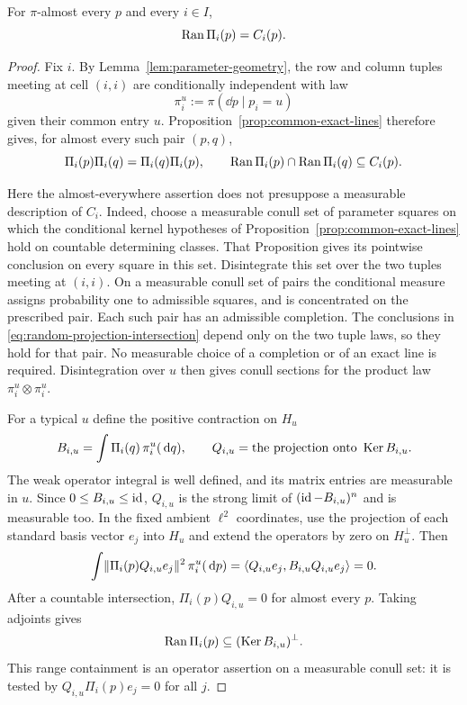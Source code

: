 \begin{lemma}\label{lem:active-exact}
For $\pi$-almost every $p$ and every $i\in I$,
\begin{equation}\label{eq:active-exact}
 \operatorname{Ran}\Pi_i(p)=C_i(p).
\end{equation}
\end{lemma}

\begin{proof}
Fix $i$. By Lemma~\ref{lem:parameter-geometry}, the row and column
tuples meeting at cell $(i,i)$ are conditionally independent with law
\[
 \pi_i^u:=\pi(\dd p\mid p_i=u)
\]
given their common entry $u$. Proposition~\ref{prop:common-exact-lines}
therefore gives, for almost every such pair $(p,q)$,
\begin{equation}\label{eq:random-projection-intersection}
 \Pi_i(p)\Pi_i(q)=\Pi_i(q)\Pi_i(p),\qquad
 \operatorname{Ran}\Pi_i(p)\cap\operatorname{Ran}\Pi_i(q)\subseteq C_i(p).
\end{equation}

Here the almost-everywhere assertion does not presuppose a measurable
description of $C_i$. Indeed, choose a measurable conull set of
parameter squares on which the conditional kernel hypotheses of
Proposition~\ref{prop:common-exact-lines} hold on countable determining
classes. That Proposition gives its pointwise conclusion on every
square in this set. Disintegrate this set over the two tuples meeting
at $(i,i)$. On a measurable conull set of pairs the conditional measure
assigns probability one to admissible squares, and is concentrated on
the prescribed pair. Each such pair has an admissible completion.
The conclusions in \eqref{eq:random-projection-intersection} depend
only on the two tuple laws, so they hold for that pair. No measurable
choice of a completion or of an exact line is required. Disintegration
over $u$ then gives conull sections for the product law
$\pi_i^u\otimes\pi_i^u$.

For a typical $u$ define the positive contraction on $H_u$
\begin{equation}\label{eq:mean-active-projection}
 B_{i,u}=\int \Pi_i(q)\,\pi_i^u(\,\mathrm d q),
 \qquad Q_{i,u}=\text{the projection onto }\operatorname{Ker} B_{i,u}.
\end{equation}
The weak operator integral is well defined, and its matrix entries are
measurable in $u$. Since $0\le B_{i,u}\le\operatorname{id}$,
$Q_{i,u}$ is the strong limit of $(\operatorname{id}-B_{i,u})^n$ and is measurable too.
In the fixed ambient $\ell^2$ coordinates, use the projection of each
standard basis vector $e_j$ into $H_u$ and extend the operators by zero
on $H_u^\perp$. Then
\[
 \int\lVert \Pi_i(p)Q_{i,u}e_j\rVert^2\,\pi_i^u(\,\mathrm d p)
 =\langle Q_{i,u}e_j,B_{i,u}Q_{i,u}e_j\rangle=0.
\]
After a countable intersection, $\Pi_i(p)Q_{i,u}=0$ for almost every
$p$. Taking adjoints gives
\begin{equation}\label{eq:active-support}
 \operatorname{Ran}\Pi_i(p)\subseteq(\operatorname{Ker} B_{i,u})^\perp.
\end{equation}
This range containment is an operator assertion on a measurable conull
set: it is tested by $Q_{i,u}\Pi_i(p)e_j=0$ for all $j$.


\end{proof}
